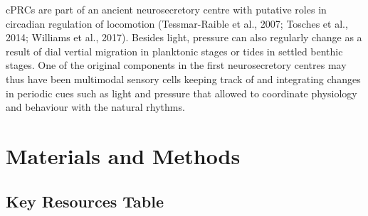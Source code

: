 \documentclass[
  11pt,
]{article}
\begin{document}
cPRCs are part of an ancient neurosecretory centre with putative roles
in circadian regulation of locomotion (Tessmar-Raible et al., 2007;
Tosches et al., 2014; Williams et al., 2017). Besides light, pressure
can also regularly change as a result of dial vertial migration in
planktonic stages or tides in settled benthic stages. One of the
original components in the first neurosecretory centres may thus have
been multimodal sensory cells keeping track of and integrating changes
in periodic cues such as light and pressure that allowed to coordinate
physiology and behaviour with the natural rhythms.

\section{Materials and Methods}\label{materials-and-methods}

\subsection{Key Resources Table}\label{key-resources-table}
\end{document}
